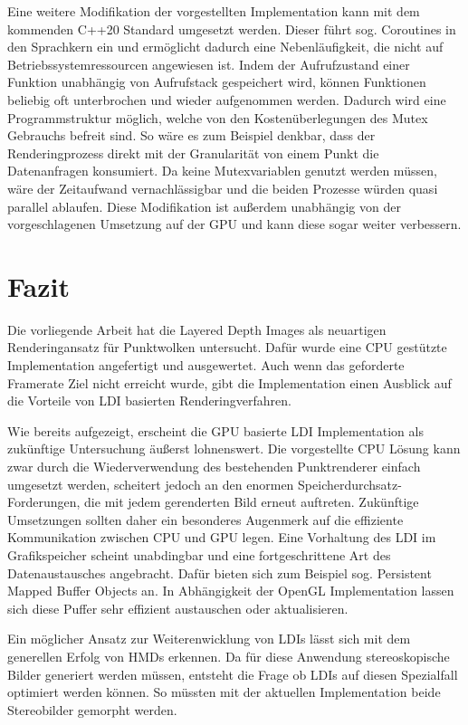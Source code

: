\documentclass[hyperref, beleg, german]{cgvpub}
\begin{document}
Eine weitere Modifikation der vorgestellten Implementation kann mit dem
kommenden C++20 Standard umgesetzt werden. Dieser führt sog. Coroutines in den
Sprachkern ein und ermöglicht dadurch eine Nebenläufigkeit, die nicht auf
Betriebssystemressourcen angewiesen ist. Indem der Aufrufzustand einer Funktion
unabhängig von Aufrufstack gespeichert wird, können Funktionen beliebig oft
unterbrochen und wieder aufgenommen werden. Dadurch wird eine Programmstruktur
möglich, welche von den Kostenüberlegungen des Mutex Gebrauchs befreit sind. So
wäre es zum Beispiel denkbar, dass der Renderingprozess direkt mit der
Granularität von einem Punkt die Datenanfragen konsumiert. Da keine
Mutexvariablen genutzt werden müssen, wäre der Zeitaufwand vernachlässigbar und
die beiden Prozesse würden quasi parallel ablaufen. Diese Modifikation ist
außerdem unabhängig von der vorgeschlagenen Umsetzung auf der GPU und kann
diese sogar weiter verbessern.

\chapter{Fazit}

Die vorliegende Arbeit hat die Layered Depth Images als neuartigen
Renderingansatz für Punktwolken untersucht. Dafür wurde eine CPU gestützte
Implementation angefertigt und ausgewertet. Auch wenn das geforderte Framerate
Ziel nicht erreicht wurde, gibt die Implementation einen Ausblick auf die
Vorteile von LDI basierten Renderingverfahren.

Wie bereits aufgezeigt, erscheint die GPU basierte LDI Implementation als
zukünftige Untersuchung äußerst lohnenswert. Die vorgestellte CPU Lösung kann
zwar durch die Wiederverwendung des bestehenden Punktrenderer einfach umgesetzt
werden, scheitert jedoch an den enormen Speicherdurchsatz-Forderungen, die mit
jedem gerenderten Bild erneut auftreten. Zukünftige Umsetzungen sollten daher
ein besonderes Augenmerk auf die effiziente Kommunikation zwischen CPU und GPU
legen. Eine Vorhaltung des LDI im Grafikspeicher scheint unabdingbar und eine
fortgeschrittene Art des Datenaustausches angebracht. Dafür bieten sich zum
Beispiel sog. Persistent Mapped Buffer Objects an. In Abhängigkeit der OpenGL
Implementation lassen sich diese Puffer sehr effizient austauschen oder
aktualisieren.

Ein möglicher Ansatz zur Weiterenwicklung von LDIs lässt sich mit dem
generellen Erfolg von HMDs erkennen. Da für diese Anwendung stereoskopische
Bilder generiert werden müssen, entsteht die Frage ob LDIs auf diesen
Spezialfall optimiert werden können. So müssten mit der aktuellen
Implementation beide Stereobilder gemorpht werden.
\end{document}
